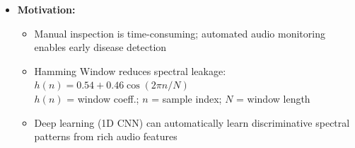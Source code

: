 \documentclass[aspectratio=169]{beamer}
\begin{document}
{\begin{frame}[t]
\begin{itemize}
  \vspace{0.15cm}

  \item \textbf{Motivation:}
    \begin{itemize}\itemsep0.5pt
      \item Manual inspection is time-consuming; automated audio monitoring\\
            enables early disease detection
      \item Hamming Window reduces spectral leakage:\\
            $h(n) = 0.54 + 0.46 \cos(2\pi n / N)$\\[2pt]
            {\tiny $h(n)$ = window coeff.; $n$ = sample index; $N$ = window length}
      \item Deep learning (1D CNN) can automatically learn discriminative spectral\\
            patterns from rich audio features
    \end{itemize}
\end{itemize}
\end{frame}
}
\end{document}
